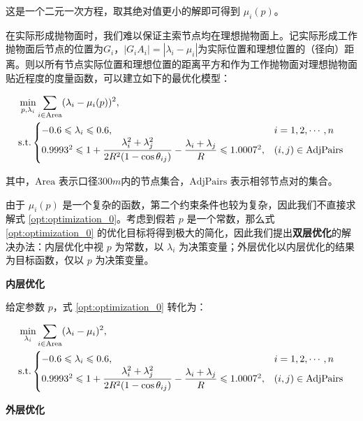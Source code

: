 \documentclass[withoutpreface,bwprint,fontset=macnew]{cumcmthesis} %
\begin{document}
	这是一个二元一次方程，取其绝对值更小的解即可得到 $\mu_i(p)$。
	
	在实际形成抛物面时，我们难以保证主索节点均在理想抛物面上。记实际形成工作抛物面后节点的位置为$G_{i}$，$|{G_{i}A_{i}}| = |\lambda_i-\mu_i|$为实际位置和理想位置的（径向）距离。则以所有节点实际位置和理想位置的距离平方和作为工作抛物面对理想抛物面贴近程度的度量函数，可以建立如下的最优化模型：
	
	\begin{align}
		&\min_{p, \lambda_i} \sum_{i\in\text{Area}}(\lambda_i-\mu_i(p))^2, \notag \\
		&\text{s.t.}\begin{cases}
			-0.6 \leqslant \lambda_i \leqslant 0.6, & i=1,2,\cdots, n\\
			0.9993^2 \leqslant 1+\dfrac{\lambda_i^2+\lambda_j^2}{2R^2(1-\cos\theta_{ij})}-\dfrac{\lambda_i+\lambda_j}{R} \leqslant 1.0007^2,&(i,j)\in\text{AdjPairs}\\
		\end{cases}
		\label {opt:optimization_0}
	\end{align}

	其中，$\text{Area}$ 表示口径$300m$内的节点集合，$\text{AdjPairs}$ 表示相邻节点对的集合。
	
	由于 $\mu_i(p)$ 是一个复杂的函数，第二个约束条件也较为复杂，因此我们不直接求解式 \ref{opt:optimization_0}。考虑到假若 $p$ 是一个常数，那么式 \ref{opt:optimization_0} 的优化目标将得到极大的简化，因此我们提出\textbf{双层优化}的解决办法：内层优化中视 $p$ 为常数，以 $\lambda_i$ 为决策变量；外层优化以内层优化的结果为目标函数，仅以 $p$ 为决策变量。
	
	\textbf{内层优化}
	
	给定参数 $p$，式 \ref{opt:optimization_0} 转化为：

	\begin{align}
		&\min_{\lambda_i} \sum_{i\in\text{Area}}(\lambda_i-\mu_i)^2, \notag \\
		&\text{s.t.}\begin{cases}
			-0.6 \leqslant \lambda_i \leqslant 0.6, & i=1,2,\cdots, n\\
			0.9993^2 \leqslant 1+\dfrac{\lambda_i^2+\lambda_j^2}{2R^2(1-\cos\theta_{ij})}-\dfrac{\lambda_i+\lambda_j}{R} \leqslant 1.0007^2,&(i,j)\in\text{AdjPairs}\\
		\end{cases}
		\label {opt:optimization_1}
	\end{align}

	\textbf{外层优化}
	
\end{document}
